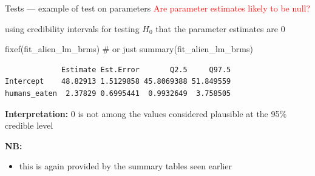 \documentclass[
  10pt,
  ignorenonframetext,
  aspectratio=169,
  t]{beamer}
\newenvironment{Shaded}{\begin{snugshade}}{\end{snugshade}}
\newcommand{\CommentTok}[1]{\textcolor[rgb]{0.37,0.37,0.37}{#1}}
\newcommand{\FunctionTok}[1]{\textcolor[rgb]{0.28,0.35,0.67}{#1}}
\newcommand{\NormalTok}[1]{\textcolor[rgb]{0.00,0.23,0.31}{#1}}
\providecommand{\tightlist}{%
  \setlength{\itemsep}{0pt}\setlength{\parskip}{0pt}}
\newcommand{\bluebold}[1]{\textcolor{bluebeamer}{\textbf{#1}}}
\begin{document}
\begin{frame}[fragile]{Tests --- example of test on parameters}
\protect{}\label{tests-example-of-test-on-parameters-1}
\textcolor{red}{Are parameter estimates likely to be null?}

using credibility intervals for testing \(H_0\) that the parameter
estimates are 0

\footnotesize

\begin{Shaded}
\begin{Highlighting}[]
\FunctionTok{fixef}\NormalTok{(fit\_alien\_lm\_brms) }\CommentTok{\# or just summary(fit\_alien\_lm\_brms)}
\end{Highlighting}
\end{Shaded}

\begin{verbatim}
             Estimate Est.Error       Q2.5     Q97.5
Intercept    48.82913 1.5129858 45.8069388 51.849559
humans_eaten  2.37829 0.6995441  0.9932649  3.758505
\end{verbatim}

\normalsize

\bluebold{Interpretation:} 0 is not among the values considered
plausible at the 95\% credible level

\textbf{NB:}

\begin{itemize}
\tightlist
\item
  this is again provided by the summary tables seen earlier
\end{itemize}
\end{frame}
\end{document}
